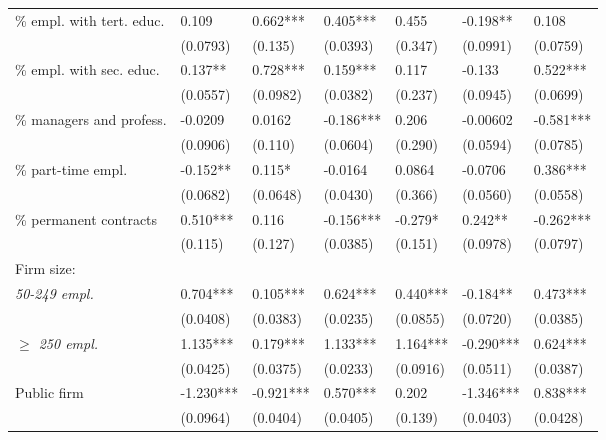 \documentclass[Review,times,sageh,11pt]{sagej}
\begin{document}
\begin{table}[thb]
{\begin{threeparttable}
\begin{tabular}{l*{6}{l}}
\% empl. with tert. educ. &  0.109     & 0.662***  & 0.405***   & 0.455     & -0.198**   & 0.108      \\
                          &  (0.0793)  & (0.135)   & (0.0393)   & (0.347)   & (0.0991)   & (0.0759)   \\[0.5ex]

\% empl. with sec. educ.  &  0.137**   & 0.728***  & 0.159***   & 0.117     & -0.133     & 0.522***   \\
                          &  (0.0557)  & (0.0982)  & (0.0382)   & (0.237)   & (0.0945)   & (0.0699)   \\[0.5ex]

\% managers and profess.  &  -0.0209   & 0.0162    & -0.186***  & 0.206     & -0.00602   & -0.581***  \\
                          &  (0.0906)  & (0.110)   & (0.0604)   & (0.290)   & (0.0594)   & (0.0785)   \\[0.5ex]

\% part-time empl.        &  -0.152**  & 0.115*    & -0.0164    & 0.0864    & -0.0706    & 0.386***   \\
                          &  (0.0682)  & (0.0648)  & (0.0430)   & (0.366)   & (0.0560)   & (0.0558)   \\[0.5ex]

\% permanent contracts    &  0.510***  & 0.116     & -0.156***  & -0.279*   & 0.242**    & -0.262***  \\
                          &  (0.115)   & (0.127)   & (0.0385)   & (0.151)   & (0.0978)   & (0.0797)   \\[0.5ex]

Firm size:                \\[1ex]
\quad \textit{50-249 empl.}              &  0.704***  & 0.105***  & 0.624***   & 0.440***  & -0.184**   & 0.473***   \\
                          &  (0.0408)  & (0.0383)  & (0.0235)   & (0.0855)  & (0.0720)   & (0.0385)   \\[0.5ex]

\quad \textit{$\geq$ 250 empl.}         &  1.135***  & 0.179***  & 1.133***   & 1.164***  & -0.290***  & 0.624***   \\
                          &  (0.0425)  & (0.0375)  & (0.0233)   & (0.0916)  & (0.0511)   & (0.0387)   \\[0.5ex]

Public firm               &  -1.230*** & -0.921*** & 0.570***   & 0.202     & -1.346***  & 0.838***   \\
                          &  (0.0964)  & (0.0404)  & (0.0405)   & (0.139)   & (0.0403)   & (0.0428)   \\[0.5ex]


\end{tabular}
\end{threeparttable}}
\end{table}
\end{document}
